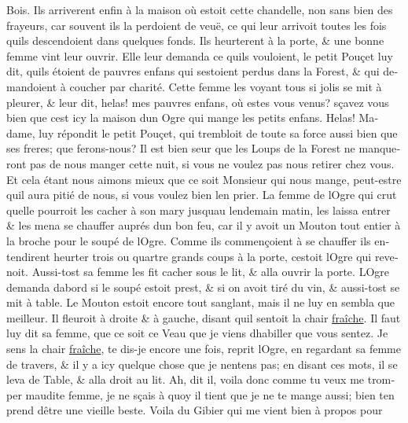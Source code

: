 \documentclass[14pt,a4paper]{memoir}
\newcommand{\ul}[1]{\uline{#1}}
\begin{document}
{{\begin{otherlanguage}{french}
Bois. Ils arriverent enfin à la maison où estoit cette chandelle, non
sans bien des frayeurs, car souvent ils la perdoient de veuë, ce qui
leur arrivoit toutes les fois qu\textquotesingle ils descendoient dans
quelques fonds. Ils heurterent à la porte, \& une bonne femme vint leur
ouvrir. Elle leur demanda ce qu\textquotesingle ils vouloient, le petit
Pouçet luy dit, qu\textquotesingle ils étoient de pauvres enfans qui
s\textquotesingle estoient perdus dans la Forest, \& qui demandoient à
coucher par charité. Cette femme les voyant tous si jolis se mit à
pleurer, \& leur dit, helas! mes pauvres enfans, où estes vous venus?
sçavez vous bien que c\textquotesingle est icy la maison
d\textquotesingle un Ogre qui mange les petits enfans. Helas! Madame,
luy répondit le petit Pouçet, qui trembloit de toute sa force aussi bien
que ses freres; que ferons-nous? Il est bien seur que les Loups de la
Forest ne manqueront pas de nous manger cette nuit, si vous ne voulez
pas nous retirer chez vous. Et cela étant nous aimons mieux que ce soit
Monsieur qui nous mange, peut-estre qu\textquotesingle il aura pitié de
nous, si vous voulez bien l\textquotesingle en prier. La femme de
l\textquotesingle Ogre qui crut qu\textquotesingle elle pourroit les
cacher à son mary jusqu\textquotesingle au lendemain matin, les laissa
entrer \& les mena se chauffer auprés d\textquotesingle un bon feu, car
il y avoit un Mouton tout entier à la broche pour le soupé de
l\textquotesingle Ogre. Comme ils commençoient à se chauffer ils
entendirent heurter trois ou quartre grands coups à la porte,
c\textquotesingle estoit l\textquotesingle Ogre qui revenoit. Aussi-tost
sa femme les fit cacher sous le lit, \& alla ouvrir la porte.
L\textquotesingle Ogre demanda d\textquotesingle abord si le soupé
estoit prest, \& si on avoit tiré du vin, \& aussi-tost se mit à table.
Le Mouton estoit encore tout sanglant, mais il ne luy en sembla que
meilleur. Il fleuroit à droite \& à gauche, disant qu\textquotesingle il
sentoit la chair \ul{fraîche}. Il faut luy dit sa femme, que ce soit ce
Veau que je viens d\textquotesingle habiller que vous sentez. Je sens la
chair \ul{fraîche}, te dis-je encore une fois, reprit
l\textquotesingle Ogre, en regardant sa femme de travers, \& il y a icy
quelque chose que je n\textquotesingle entens pas; en disant ces mots,
il se leva de Table, \& alla droit au lit. Ah, dit il, voila donc comme
tu veux me tromper maudite femme, je ne sçais à quoy il tient que je ne
te mange aussi; bien t\textquotesingle en prend d\textquotesingle être
une vieille beste. Voila du Gibier qui me vient bien à propos pour

\end{otherlanguage}}}
\end{document}
